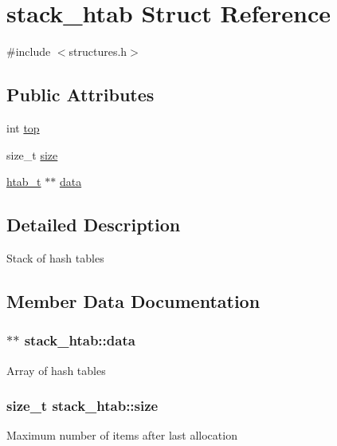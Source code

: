 \hypertarget{structstack__htab}{}\section{stack\+\_\+htab Struct Reference}
\label{structstack__htab}


{\ttfamily \#include $<$structures.\+h$>$}

\subsection*{Public Attributes}
\begin{DoxyCompactItemize}
\item 
int \hyperlink{structstack__htab_a1bb9f9cb590d2082d0b202f0be999a74}{top}
\item 
size\+\_\+t \hyperlink{structstack__htab_a95f7b033f614ca5941b0f3b2237c059e}{size}
\item 
\hyperlink{structhtab__t}{htab\+\_\+t} $\ast$$\ast$ \hyperlink{structstack__htab_a88d95f776e47e2eb2005e7ee11330b3f}{data}
\end{DoxyCompactItemize}


\subsection{Detailed Description}
Stack of hash tables 

\subsection{Member Data Documentation}
\hypertarget{structstack__htab_a88d95f776e47e2eb2005e7ee11330b3f}{}
\subsubsection[{data}]{$\ast$$\ast$ stack\+\_\+htab\+::data}\label{structstack__htab_a88d95f776e47e2eb2005e7ee11330b3f}
Array of hash tables \hypertarget{structstack__htab_a95f7b033f614ca5941b0f3b2237c059e}{}
\subsubsection[{size}]{\setlength{\rightskip}{0pt plus 5cm}size\+\_\+t stack\+\_\+htab\+::size}\label{structstack__htab_a95f7b033f614ca5941b0f3b2237c059e}
Maximum number of items after last allocation \hypertarget{structstack__htab_a1bb9f9cb590d2082d0b202f0be999a74}{}
